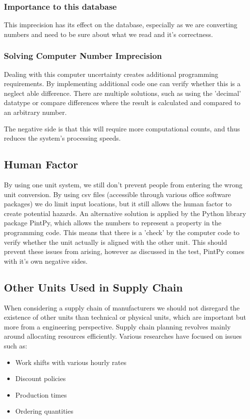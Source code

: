 \documentclass[sigchi, nonacm]{acmart}
\begin{document}
\subsubsection{Importance to this database}
This imprecision has its effect on the database, especially as we are converting numbers and need to be sure about what we read and it's correctness.

\subsubsection{Solving Computer Number Imprecision}
Dealing with this computer uncertainty creates additional programming requirements. By implementing additional code one can verify whether this is a neglect able difference. There are multiple solutions, such as using the 'decimal' datatype or compare differences where the result is calculated and compared to an arbitrary number.

The negative side is that this will require more computational counts, and thus reduces the system's processing speeds.

\subsection{Human Factor}
By using one unit system, we still don't prevent people from entering the wrong unit conversion. By using csv files (accessible through various office software packages) we do limit input locations, but it still allows the human factor to create potential hazards. An alternative solution is applied by the Python library package PintPy, which allows the numbers to represent a property in the programming code. This means that there is a 'check' by the computer code to verify whether the unit actually is aligned with the other unit. This should prevent these issues from arising, however as discussed in the test, PintPy comes with it's own negative sides.

\subsection{Other Units Used in Supply Chain}
When considering a supply chain of manufacturers we should not disregard the existence of other units than technical or physical units, which are important but more from a engineering perspective. Supply chain planning revolves mainly around allocating resources efficiently. Various researches \cite{graves1998dynamic}\cite{sarkar2016supply} have focused on issues such as:
\begin{itemize}
    \item{Work shifts with various hourly rates}
    \item{Discount policies}
    \item{Production times}
    \item{Ordering quantities}
\end{itemize}
\end{document}
